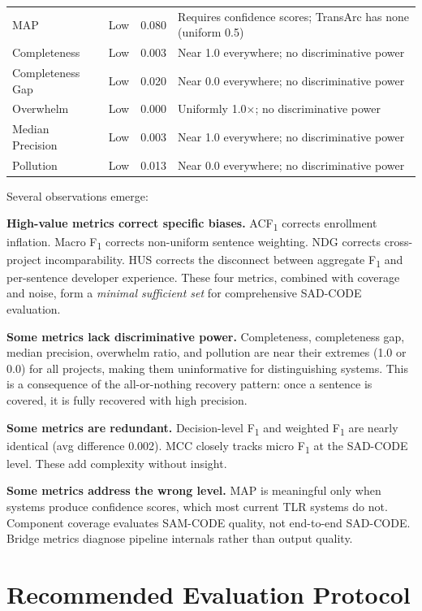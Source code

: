 \documentclass[11pt,a4paper]{report}
\newcommand{\sadcode}{SAD-CODE\xspace}
\newcommand{\samcode}{SAM-CODE\xspace}
\newcommand{\transarc}{TransArc\xspace}
\newcommand{\fone}{F\textsubscript{1}\xspace}
\newcommand{\acfone}{ACF\textsubscript{1}\xspace}
\begin{document}
\begin{table}[h]
\begin{tabular}{lccp{5.5cm}}
MAP & Low & 0.080 & Requires confidence scores; \transarc has none (uniform 0.5) \\
Completeness & Low & 0.003 & Near 1.0 everywhere; no discriminative power \\
Completeness Gap & Low & 0.020 & Near 0.0 everywhere; no discriminative power \\
Overwhelm & Low & 0.000 & Uniformly 1.0$\times$; no discriminative power \\
Median Precision & Low & 0.003 & Near 1.0 everywhere; no discriminative power \\
Pollution & Low & 0.013 & Near 0.0 everywhere; no discriminative power \\
\bottomrule
\end{tabular}
\end{table}

Several observations emerge:

\textbf{High-value metrics correct specific biases.} \acfone corrects
enrollment inflation. Macro \fone corrects non-uniform sentence weighting.
NDG corrects cross-project incomparability. HUS corrects the disconnect
between aggregate \fone and per-sentence developer experience. These four
metrics, combined with coverage and noise, form a \emph{minimal sufficient
set} for comprehensive \sadcode evaluation.

\textbf{Some metrics lack discriminative power.} Completeness, completeness
gap, median precision, overwhelm ratio, and pollution are near their
extremes (1.0 or 0.0) for all projects, making them uninformative for
distinguishing systems. This is a consequence of the all-or-nothing
recovery pattern: once a sentence is covered, it is fully recovered with
high precision.

\textbf{Some metrics are redundant.} Decision-level \fone and weighted \fone
are nearly identical (avg difference 0.002). MCC closely tracks micro \fone at
the \sadcode level. These add complexity without insight.

\textbf{Some metrics address the wrong level.} MAP is meaningful only when
systems produce confidence scores, which most current TLR systems do not.
Component coverage evaluates \samcode quality, not end-to-end \sadcode.
Bridge metrics diagnose pipeline internals rather than output quality.


\section{Recommended Evaluation Protocol}
\label{sec:eval:protocol}
\end{document}

